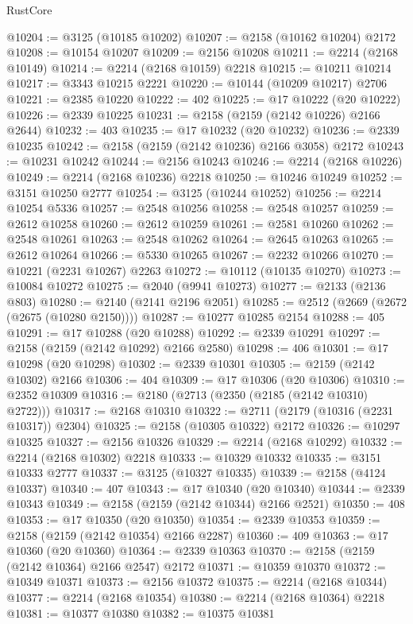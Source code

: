 \begin{lexlean}{RustCore}
\begin{coremodule}
@10204 := @3125 (@10185 @10202)
@10207 := @2158 (@10162 @10204) @2172
@10208 := @10154 @10207
@10209 := @2156 @10208
@10211 := @2214 (@2168 @10149)
@10214 := @2214 (@2168 @10159) @2218
@10215 := @10211 @10214
@10217 := @3343 @10215 @2221
@10220 := @10144 (@10209 @10217) @2706
@10221 := @2385 @10220
@10222 := 402
@10225 := @17 @10222 (@20 @10222)
@10226 := @2339 @10225
@10231 := @2158 (@2159 (@2142 @10226) @2166 @2644)
@10232 := 403
@10235 := @17 @10232 (@20 @10232)
@10236 := @2339 @10235
@10242 := @2158 (@2159 (@2142 @10236) @2166 @3058) @2172
@10243 := @10231 @10242
@10244 := @2156 @10243
@10246 := @2214 (@2168 @10226)
@10249 := @2214 (@2168 @10236) @2218
@10250 := @10246 @10249
@10252 := @3151 @10250 @2777
@10254 := @3125 (@10244 @10252)
@10256 := @2214 @10254 @5336
@10257 := @2548 @10256
@10258 := @2548 @10257
@10259 := @2612 @10258
@10260 := @2612 @10259
@10261 := @2581 @10260
@10262 := @2548 @10261
@10263 := @2548 @10262
@10264 := @2645 @10263
@10265 := @2612 @10264
@10266 := @5330 @10265
@10267 := @2232 @10266
@10270 := @10221 (@2231 @10267) @2263
@10272 := @10112 (@10135 @10270)
@10273 := @10084 @10272
@10275 := @2040 (@9941 @10273)
@10277 := @2133 (@2136 @803)
@10280 := @2140 (@2141 @2196 @2051)
@10285 := @2512 (@2669 (@2672 (@2675 (@10280 @2150))))
@10287 := @10277 @10285 @2154
@10288 := 405
@10291 := @17 @10288 (@20 @10288)
@10292 := @2339 @10291
@10297 := @2158 (@2159 (@2142 @10292) @2166 @2580)
@10298 := 406
@10301 := @17 @10298 (@20 @10298)
@10302 := @2339 @10301
@10305 := @2159 (@2142 @10302) @2166
@10306 := 404
@10309 := @17 @10306 (@20 @10306)
@10310 := @2352 @10309
@10316 := @2180 (@2713 (@2350 (@2185 (@2142 @10310) @2722)))
@10317 := @2168 @10310
@10322 := @2711 (@2179 (@10316 (@2231 @10317)) @2304)
@10325 := @2158 (@10305 @10322) @2172
@10326 := @10297 @10325
@10327 := @2156 @10326
@10329 := @2214 (@2168 @10292)
@10332 := @2214 (@2168 @10302) @2218
@10333 := @10329 @10332
@10335 := @3151 @10333 @2777
@10337 := @3125 (@10327 @10335)
@10339 := @2158 (@4124 @10337)
@10340 := 407
@10343 := @17 @10340 (@20 @10340)
@10344 := @2339 @10343
@10349 := @2158 (@2159 (@2142 @10344) @2166 @2521)
@10350 := 408
@10353 := @17 @10350 (@20 @10350)
@10354 := @2339 @10353
@10359 := @2158 (@2159 (@2142 @10354) @2166 @2287)
@10360 := 409
@10363 := @17 @10360 (@20 @10360)
@10364 := @2339 @10363
@10370 := @2158 (@2159 (@2142 @10364) @2166 @2547) @2172
@10371 := @10359 @10370
@10372 := @10349 @10371
@10373 := @2156 @10372
@10375 := @2214 (@2168 @10344)
@10377 := @2214 (@2168 @10354)
@10380 := @2214 (@2168 @10364) @2218
@10381 := @10377 @10380
@10382 := @10375 @10381

\end{coremodule}
\end{lexlean}
